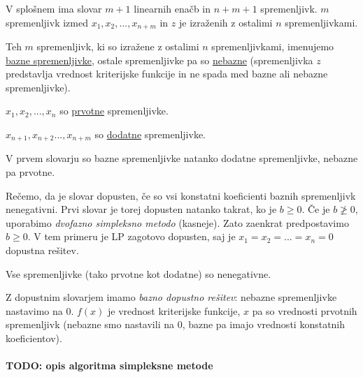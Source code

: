 \documentclass[11pt, a4paper]{article}
\begin{document}
    V splošnem ima slovar \(m+1\) linearnih enačb in \(n+m+1\) spremenljivk.
    \(m\) spremenljivk izmed \(x_1,x_2,...,x_{n+m}\) in \(z\) je izraženih z ostalimi \(n\) spremenljivkami.

    \par
    Teh \(m\) spremenljivk, ki so izražene z ostalimi \(n\) spremenljivkami, imenujemo \underline{bazne spremenljivke}, ostale spremenljivke pa so \underline{nebazne} (spremenljivka \(z\) predstavlja vrednost kriterijske funkcije in ne spada med bazne ali nebazne spremenljivke).

    \par
    \(x_1,x_2,...,x_n\) so \underline{prvotne} spremenljivke.
    \par
    \(x_{n+1},x_{n+2}...,x_{n+m}\) so \underline{dodatne} spremenljivke.

    \par
    V prvem slovarju so bazne spremenljivke natanko dodatne spremenljivke, nebazne pa prvotne.

    \par
    Rečemo, da je slovar dopusten, če so vsi konstatni koeficienti baznih spremenljivk nenegativni. Prvi slovar je torej dopusten natanko takrat, ko je \(b \ge 0\). Če je \(b \ngeq 0\), uporabimo \textit{dvofazno simpleksno metodo} (kasneje). Zato zaenkrat predpostavimo \(b \ge 0\). V tem primeru je LP zagotovo dopusten, saj je \(x_1=x_2=...=x_n=0\) dopustna rešitev.
    \par
    \begin{remark}
        Vse spremenljivke (tako prvotne kot dodatne) so nenegativne.
    \end{remark}
    
    \par
    Z dopustnim slovarjem imamo \textit{bazno dopustno rešitev}: nebazne spremenljivke nastavimo na 0. \(f(x)\) je vrednost kriterijske funkcije, \(x\) pa so vrednosti prvotnih spremenljivk (nebazne smo nastavili na 0, bazne pa imajo vrednosti konstatnih koeficientov).
    
    \paragraph{TODO: opis algoritma simpleksne metode}
\end{document}
